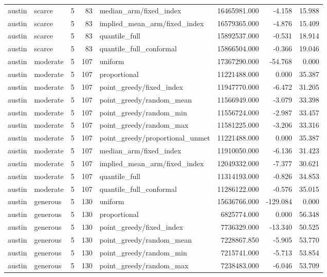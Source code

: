 \begin{tabular}{llrrlrrr}
austin & scarce & 5 & 83 & median\_arm/fixed\_index & 16465981.000 & -4.158 & 15.988 \\
austin & scarce & 5 & 83 & implied\_mean\_arm/fixed\_index & 16579365.000 & -4.876 & 15.409 \\
austin & scarce & 5 & 83 & quantile\_full & 15892537.000 & -0.531 & 18.914 \\
austin & scarce & 5 & 83 & quantile\_full\_conformal & 15866504.000 & -0.366 & 19.046 \\
austin & moderate & 5 & 107 & uniform & 17367290.000 & -54.768 & 0.000 \\
austin & moderate & 5 & 107 & proportional & 11221488.000 & 0.000 & 35.387 \\
austin & moderate & 5 & 107 & point\_greedy/fixed\_index & 11947770.000 & -6.472 & 31.205 \\
austin & moderate & 5 & 107 & point\_greedy/random\_mean & 11566949.000 & -3.079 & 33.398 \\
austin & moderate & 5 & 107 & point\_greedy/random\_min & 11556724.000 & -2.987 & 33.457 \\
austin & moderate & 5 & 107 & point\_greedy/random\_max & 11581225.000 & -3.206 & 33.316 \\
austin & moderate & 5 & 107 & point\_greedy/proportional\_unmet & 11221488.000 & 0.000 & 35.387 \\
austin & moderate & 5 & 107 & median\_arm/fixed\_index & 11910050.000 & -6.136 & 31.423 \\
austin & moderate & 5 & 107 & implied\_mean\_arm/fixed\_index & 12049332.000 & -7.377 & 30.621 \\
austin & moderate & 5 & 107 & quantile\_full & 11314193.000 & -0.826 & 34.853 \\
austin & moderate & 5 & 107 & quantile\_full\_conformal & 11286122.000 & -0.576 & 35.015 \\
austin & generous & 5 & 130 & uniform & 15636766.000 & -129.084 & 0.000 \\
austin & generous & 5 & 130 & proportional & 6825774.000 & 0.000 & 56.348 \\
austin & generous & 5 & 130 & point\_greedy/fixed\_index & 7736329.000 & -13.340 & 50.525 \\
austin & generous & 5 & 130 & point\_greedy/random\_mean & 7228867.850 & -5.905 & 53.770 \\
austin & generous & 5 & 130 & point\_greedy/random\_min & 7215741.000 & -5.713 & 53.854 \\
austin & generous & 5 & 130 & point\_greedy/random\_max & 7238483.000 & -6.046 & 53.709 \\

\end{tabular}
